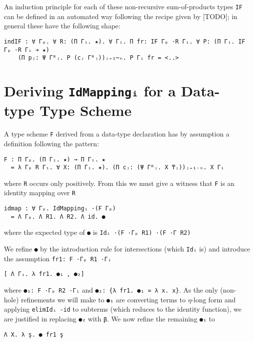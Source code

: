 \documentclass{article}
\begin{document}
An induction principle for each of these non-recursive sum-of-products types
\verb;IF; can be defined in an automated way following the recipe given by
[TODO]; in general these have the following shape:

\begin{verbatim}
indIF : ∀ Γₚ. ∀ R: (Π Γᵢ. ★). ∀ Γᵢ. Π fr: IF Γₚ ·R Γᵢ. ∀ P: (Π Γᵢ. IF Γₚ ·R Γᵢ ➔ ★)
    (Π pⱼ: Ψ Γᴿⱼ. P (cⱼ Γᴿⱼ))ⱼ₌₁⋯ₙ. P Γᵢ fr = <..>
\end{verbatim}

\appendix
\section{Deriving \texttt{IdMappingᵢ} for a Data-type Type Scheme}
A type scheme \verb;F; derived from a data-type declaration has by assumption a
definition following the pattern:

\begin{verbatim}
F : Π Γₚ. (Π Γᵢ. ★) → Π Γᵢ. ★
  = λ Γₚ R Γᵢ. ∀ X: (Π Γᵢ. ★). (Π cⱼ: (Ψ Γᴿⱼ. X ₸ⱼ))ⱼ₌₁₋ₙ. X Γᵢ
\end{verbatim}

\noindent where \verb;R; occurs only positively. From this we must give a
witness that \verb;F; is an identity mapping over \verb;R;

\begin{verbatim}
idmap : ∀ Γₚ. IdMappingᵢ ·(F Γₚ)
  = Λ Γₚ. Λ R1. Λ R2. Λ id. ●
\end{verbatim}

\noindent where the expected type of \verb;●; is \verb;Idᵢ ·(F ·Γₚ R1) ·(F ·Γ R2);

We refine \verb;●; by the introduction rule for intersections (which \verb;Idᵢ; is) and
introduce the assumption \verb;fr1: F ·Γₚ R1 ·Γᵢ;

\begin{verbatim}
[ Λ Γᵢ. λ fr1. ●₁ , ●₂]
\end{verbatim}

\noindent where \verb;●₁: F ·Γₚ R2 ·Γᵢ; and \verb;●₂: {λ fr1. ●₁ ≃ λ x. x};. As
the only (non-hole) refinements we will make to \verb;●₁; are converting terms to $\eta$-long
form and applying \verb;elimIdᵢ -id; to subterms (which reduces to the identity
function), we are justified in replacing \verb;●₂; with \verb;β;. We now refine
the remaining \verb;●₁; to

\begin{verbatim}
Λ X. λ ş. ● fr1 ş
\end{verbatim}
\end{document}
